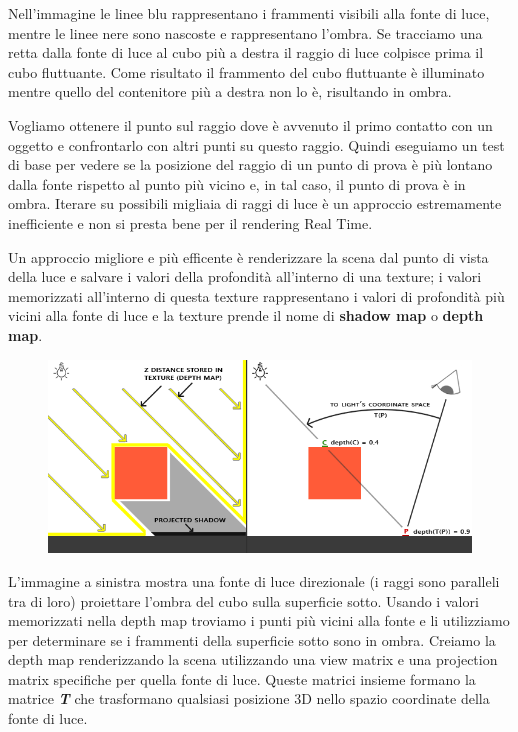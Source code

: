 \documentclass[12pt]{report}
\begin{document}
Nell’immagine  le linee blu rappresentano i frammenti visibili alla fonte di luce, mentre le linee nere sono nascoste e rappresentano l’ombra. Se tracciamo una retta dalla fonte di luce al cubo più a destra il raggio di luce colpisce prima il cubo fluttuante. Come risultato il frammento del cubo fluttuante è illuminato mentre quello del contenitore più a destra non lo è, risultando in ombra.

Vogliamo ottenere il punto sul raggio dove è avvenuto il primo contatto con un oggetto e confrontarlo con altri punti su questo raggio. Quindi eseguiamo un test di base per vedere se la posizione del raggio di un punto di prova è più lontano dalla fonte rispetto al punto più vicino e, in tal caso, il punto di prova è in ombra. Iterare su possibili migliaia di raggi di luce è un approccio estremamente inefficiente e non si presta bene per il rendering Real Time.

Un approccio migliore e più efficente è renderizzare la scena dal punto di vista della luce e salvare i valori della profondità all'interno di una texture; i valori memorizzati all'interno di questa texture rappresentano i valori di profondità più vicini alla fonte di luce e la texture prende il nome di \textbf{shadow map} o \textbf{depth map}.\\

\begin{figure}[H]
  \centering
    \includegraphics[width=1.0\textwidth]{img/shadow_mapping_theory_spaces.png}
\end{figure}
 
L’immagine a sinistra mostra una fonte di luce direzionale (i raggi sono paralleli tra di loro) proiettare l'ombra del cubo sulla superficie sotto. Usando i valori memorizzati nella depth map troviamo i punti più vicini alla fonte e li utilizziamo per determinare se i frammenti della superficie sotto sono in ombra. Creiamo la depth map renderizzando la scena utilizzando una view matrix e una projection matrix specifiche per quella fonte di luce. Queste matrici insieme formano la matrice \textit{\textbf{T}} che trasformano qualsiasi posizione 3D nello spazio coordinate della fonte di luce.
\end{document}
